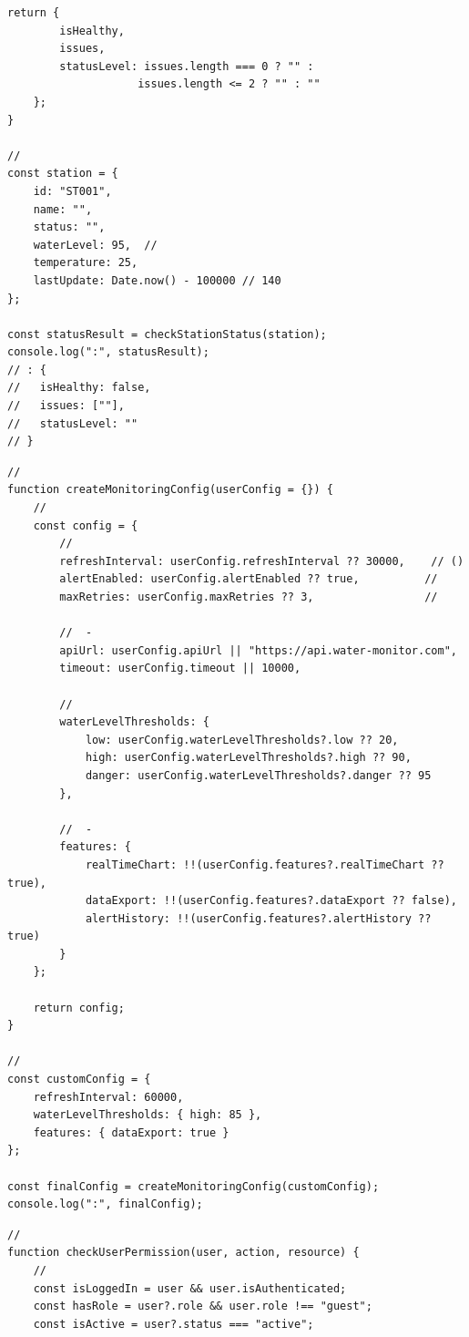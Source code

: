 {\begin{lstlisting}[style=javascript]
    return {
        isHealthy,
        issues,
        statusLevel: issues.length === 0 ? "" : 
                    issues.length <= 2 ? "" : ""
    };
}

// 
const station = {
    id: "ST001",
    name: "",
    status: "",
    waterLevel: 95,  // 
    temperature: 25,
    lastUpdate: Date.now() - 100000 // 140
};

const statusResult = checkStationStatus(station);
console.log(":", statusResult);
// : {
//   isHealthy: false,
//   issues: [""],
//   statusLevel: ""
// }
\end{lstlisting}

\important{}

\begin{lstlisting}[style=javascript]
// 
function createMonitoringConfig(userConfig = {}) {
    // 
    const config = {
        // 
        refreshInterval: userConfig.refreshInterval ?? 30000,    // ()
        alertEnabled: userConfig.alertEnabled ?? true,          // 
        maxRetries: userConfig.maxRetries ?? 3,                 // 
        
        //  - 
        apiUrl: userConfig.apiUrl || "https://api.water-monitor.com",
        timeout: userConfig.timeout || 10000,
        
        // 
        waterLevelThresholds: {
            low: userConfig.waterLevelThresholds?.low ?? 20,
            high: userConfig.waterLevelThresholds?.high ?? 90,
            danger: userConfig.waterLevelThresholds?.danger ?? 95
        },
        
        //  - 
        features: {
            realTimeChart: !!(userConfig.features?.realTimeChart ?? true),
            dataExport: !!(userConfig.features?.dataExport ?? false),
            alertHistory: !!(userConfig.features?.alertHistory ?? true)
        }
    };
    
    return config;
}

// 
const customConfig = {
    refreshInterval: 60000,
    waterLevelThresholds: { high: 85 },
    features: { dataExport: true }
};

const finalConfig = createMonitoringConfig(customConfig);
console.log(":", finalConfig);
\end{lstlisting}

\important{}

\begin{lstlisting}[style=javascript]
// 
function checkUserPermission(user, action, resource) {
    // 
    const isLoggedIn = user && user.isAuthenticated;
    const hasRole = user?.role && user.role !== "guest";
    const isActive = user?.status === "active";
    

\end{lstlisting}}
